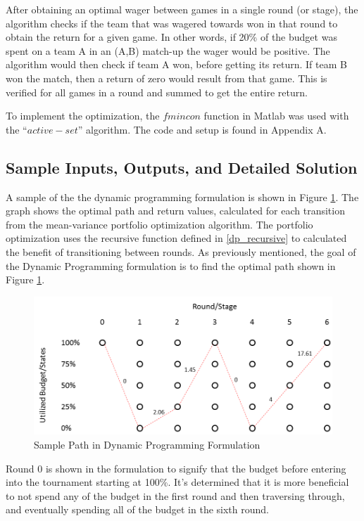 \documentclass[12pt]{article}
\begin{document}
After obtaining an optimal wager between games in a single round (or stage), the algorithm checks if the team that was wagered towards won in that round to obtain the return for a given game.
In other words, if 20\% of the budget was spent on a team A in an (A,B) match-up the wager would be positive.
The algorithm would then check if team A won, before getting its return.
If team B won the match, then a return of zero would result from that game.
This is verified for all games in a round and summed to get the entire return.

To implement the optimization, the $fmincon$ function in Matlab was used with the ``$active-set$'' algorithm.
The code and setup is found in Appendix A.

\subsection{Sample Inputs, Outputs, and Detailed Solution}
A sample of the the dynamic programming formulation is shown in Figure \ref{sampleDP}.
The graph shows the optimal path and return values, calculated for each transition from the mean-variance portfolio optimization algorithm.
The portfolio optimization uses the recursive function defined in \eqref{dp_recursive} to calculated the benefit of transitioning between rounds.
As previously mentioned, the goal of the Dynamic Programming formulation is to find the optimal path shown in Figure \ref{sampleDP}.
\begin{figure}[H]
\centering
	\includegraphics[scale=.5]{sampleDP.png}%
	\caption{Sample Path in Dynamic Programming Formulation}
	\label{sampleDP}
\end{figure}
Round 0 is shown in the formulation to signify that the budget before entering into the tournament starting at 100\%.
It's determined that it is more beneficial to not spend any of the budget in the first round and then traversing through, and eventually spending all of the budget in the sixth round.
\end{document}
